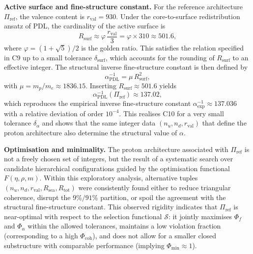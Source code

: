 \documentclass[11pt,a4paper]{article}
\begin{document}
\medskip
\noindent\textbf{Active surface and fine-structure constant.} For the reference architecture $\Pi_{\mathrm{ref}}$, the valence content is $r_{\mathrm{val}}=930$. Under the core-to-surface redistribution ansatz of PDL, the cardinality of the active surface is
\begin{equation}
R_{\mathrm{surf}} \approx \varphi\,\frac{r_{\mathrm{val}}}{3} = \varphi\times 310 \approx 501.6,
\end{equation}
where $\varphi=(1+\sqrt{5})/2$ is the golden ratio.\cite{LaubscherGoldenRatioPDL2026} This satisfies the relation specified in C9 up to a small tolerance $\delta_{\mathrm{surf}}$, which accounts for the rounding of $R_{\mathrm{surf}}$ to an effective integer. The structural inverse fine-structure constant is then defined by
\begin{equation}
\alpha_{\mathrm{PDL}}^{-1} = \mu\,R_{\mathrm{surf}}^{2},
\end{equation}
with $\mu=m_p/m_e\approx 1836.15$. Inserting $R_{\mathrm{surf}}\approx 501.6$ yields
\begin{equation}
\alpha_{\mathrm{PDL}}^{-1}(\Pi_{\mathrm{ref}}) \approx 137.02,
\end{equation}
which reproduces the empirical inverse fine-structure constant $\alpha_{\mathrm{exp}}^{-1}\approx 137.036$ with a relative deviation of order $10^{-4}$.\cite{LaubscherDerivationAlpha2026} This realises C10 for a very small tolerance $\delta_{\alpha}$ and shows that the same integer data $(n_u,n_d,r_{\mathrm{val}})$ that define the proton architecture also determine the structural value of $\alpha$.

\medskip
\noindent\textbf{Optimisation and minimality.} The proton architecture associated with $\Pi_{\mathrm{ref}}$ is not a freely chosen set of integers, but the result of a systematic search over candidate hierarchical configurations guided by the optimisation functional $F(\eta,\rho,m)$.\cite{LaubscherPDLFull2026,LaubscherIMRadPDL2026} Within this exploratory analysis, alternative tuples $(n_u,n_d,r_{\mathrm{val}},R_{\mathrm{sea}},R_{\mathrm{tot}})$ were consistently found either to reduce triangular coherence, disrupt the $9\%/91\%$ partition, or spoil the agreement with the structural fine-structure constant. This observed rigidity indicates that $\Pi_{\mathrm{ref}}$ is near-optimal with respect to the selection functional $\mathcal{S}$: it jointly maximises $\Phi_f$ and $\Phi_{\alpha}$ within the allowed tolerances, maintains a low violation fraction (corresponding to a high $\Phi_{\mathrm{coh}}$), and does not allow for a smaller closed substructure with comparable performance (implying $\Phi_{\mathrm{min}}\approx 1$).\cite{LaubscherPDLFull2026}
\end{document}
